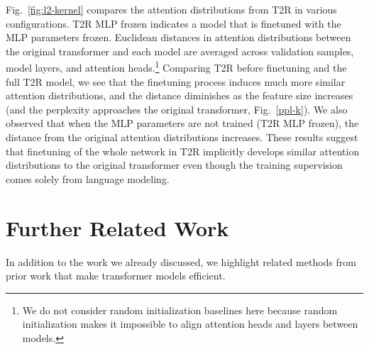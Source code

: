 \documentclass[11pt]{article}
\newcommand{\TRNN}{T2R\xspace}
\begin{document}
Fig.\ \ref{fig:l2-kernel} compares the attention distributions from \TRNN in various configurations.
\TRNN MLP frozen indicates a model that is finetuned with the MLP parameters frozen.
Euclidean distances in attention distributions between the original transformer and each model are averaged across validation samples, model layers, and attention heads.\footnote{We do not consider random initialization baselines here because random initialization makes it impossible to align attention heads and layers between models.}
Comparing \TRNN before finetuning and the full \TRNN model, we see that the finetuning process induces much more similar attention distributions, and the distance diminishes as the feature size increases (and the perplexity approaches the original transformer, Fig.\ \ref{ppl-k}).
We also observed that when the MLP parameters are not trained (\TRNN MLP frozen), the distance from the original attention distributions increases.
These results suggest that finetuning of the whole network in \TRNN implicitly develops similar attention distributions to the original transformer even though the training supervision comes solely from language modeling.





























\section{Further Related Work}
\label{sec:related_work}
In addition to the work we already discussed, we highlight related methods from prior work that make transformer models efficient.
\end{document}
